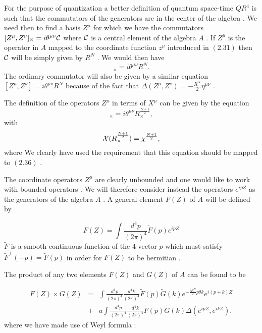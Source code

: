 \documentclass[a4paper,12pt]{article}
\begin{document}
For the purpose of quantization a better definition of quantum
space-time $QR^4$ is such that the commutators of the generators
are in the center of the algebra . We need then to find a basis
$Z^{\mu}$ for which we have the commutators
$[Z^{\mu},Z^{\nu}]_{\times}=i{\theta}^{{\mu}{\nu}}{\cal C}$ where
${\cal C}$ is a central element of the algebra $A$ . If $Z^{\mu}$
is the operator in $A$ mapped to the coordinate function $z^{\mu}$
introduced in $(2.31)$ then ${\cal C}$ will be simply given by
$R^N$ . We would then have
\begin{equation}
[Z^{\mu},Z^{\nu}]_{\times}=i{\theta}^{{\mu}{\nu}}R^N.
\end{equation}
The ordinary commutator will also be given by a similar equation
$[Z^{\mu},Z^{\nu}]=i{\theta}^{{\mu}{\nu}}R^N $ because of the
fact that
${\Delta}(Z^{\mu},Z^{\nu})=-\frac{R^N}{2}{\eta}^{{\mu}{\nu}}$ .

The definition of the operators $Z^{\mu}$ in terms of $X^{\mu}$
can be given by the equation
\begin{equation}
[X^{\mu},Z^{\nu}]_{\times}=i{\theta}^{{\mu}{\nu}}R_{\times}^{\frac{N+1}{2}},
\end{equation}
with
\begin{equation}
{\cal X}(R_{\times}^{\frac{N+1}{2}})={\chi}^{\frac{N+1}{2}},
\end{equation}
 where We clearly have used the requirement that this equation
should be mapped to $(2.36)$ .

The coordinate operators $Z^{\mu}$ are clearly unbounded and one
would like to work with bounded operators . We will therefore
consider instead the operators $e^{ipZ}$ as the generators of the
algebra $A$ . A general element $F(Z)$ of $A$ will be defined by

\begin{equation}
F(Z)=\int \frac{d^4p}{(2{\pi})^4}\tilde{F}(p) e^{ipZ}
\end{equation}
$\tilde{F}$ is a smooth continuous function of the $4$-vector $p$
which must satisfy $\tilde{F}^{+}(-p)=\tilde{F}(p)$ in order for
$F(Z)$ to be hermitian .

The product of any two elements $F(Z)$ and $G(Z)$ of $A$ can be
found to be

\begin{eqnarray}
F(Z){\times}G(Z)&=&\int\frac{d^4p}{(2{\pi})^4}\frac{d^4k}{(2{\pi})^4}\tilde{F}(p)\tilde{G}(k)e^{-\frac{iR^N}{2}p{\theta}k}e^{i(p+k)Z}\nonumber\\
&+&a\int\frac{d^4p}{(2{\pi})^4}\frac{d^4k}{(2{\pi})^4}\tilde{F}(p)\tilde{G}(k){\Delta}(e^{ipZ},e^{ikZ}).
\end{eqnarray}
where we have made use of Weyl formula :
\end{document}
